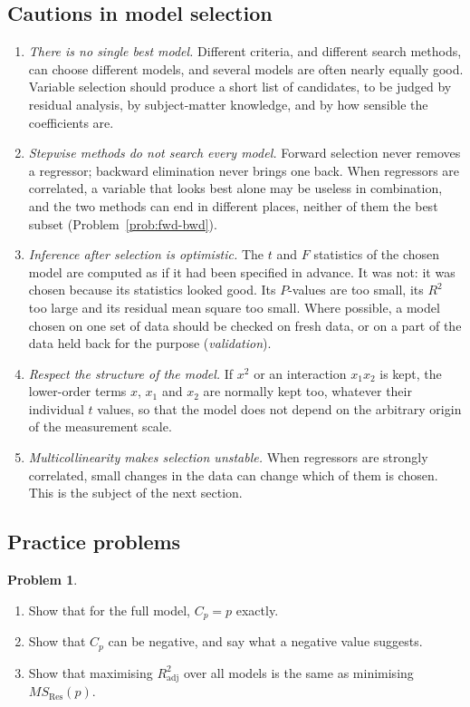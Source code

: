 \documentclass[11pt,a4paper]{article}
\numberwithin{equation}{section}
\theoremstyle{definition}
\newtheorem{problemx}{Problem}[subsection]
\newenvironment{problem}{\begin{problemx}}{\end{problemx}}
\begin{document}
\subsection{Cautions in model selection}
\begin{enumerate}[label=(\roman*)]
\item \emph{There is no single best model.} Different criteria, and different search methods, can
choose different models, and several models are often nearly equally good. Variable selection
should produce a short list of candidates, to be judged by residual analysis, by subject-matter
knowledge, and by how sensible the coefficients are.
\item \emph{Stepwise methods do not search every model.} Forward selection never removes a
regressor; backward elimination never brings one back. When regressors are correlated, a variable
that looks best alone may be useless in combination, and the two methods can end in different
places, neither of them the best subset (Problem~\ref{prob:fwd-bwd}).
\item \emph{Inference after selection is optimistic.} The $t$ and $F$ statistics of the chosen model
are computed as if it had been specified in advance. It was not: it was chosen because its
statistics looked good. Its $P$-values are too small, its $R^2$ too large and its residual mean
square too small. Where possible, a model chosen on one set of data should be checked on fresh
data, or on a part of the data held back for the purpose (\emph{validation}).
\item \emph{Respect the structure of the model.} If $x^2$ or an interaction $x_1x_2$ is kept, the
lower-order terms $x$, $x_1$ and $x_2$ are normally kept too, whatever their individual $t$ values, so
that the model does not depend on the arbitrary origin of the measurement scale.
\item \emph{Multicollinearity makes selection unstable.} When regressors are strongly correlated, small
changes in the data can change which of them is chosen. This is the subject of the next section.
\end{enumerate}

\subsection{Practice problems}
\begin{problem}\label{prob:cp-full}
\begin{enumerate}[label=(\alph*)]
\item Show that for the full model, $C_p = p$ exactly.
\item Show that $C_p$ can be negative, and say what a negative value suggests.
\item Show that maximising $R^2_{\mathrm{adj}}$ over all models is the same as minimising $MS_{\mathrm{Res}}(p)$.
\end{enumerate}
\end{problem}
\end{document}
